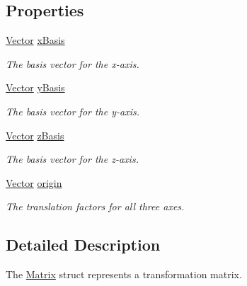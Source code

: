 \subsection*{Properties}
\begin{DoxyCompactItemize}
\item 
\mbox{\hyperlink{struct_leap_1_1_vector}{Vector}} \mbox{\hyperlink{struct_leap_1_1_matrix_a5778d424f6d76d84fe7a479b936b06ad}{x\+Basis}}
\begin{DoxyCompactList}\small\item\em The basis vector for the x-\/axis. \end{DoxyCompactList}\item 
\mbox{\hyperlink{struct_leap_1_1_vector}{Vector}} \mbox{\hyperlink{struct_leap_1_1_matrix_a1349c27faa44dff7480ca0e3d4a093f0}{y\+Basis}}
\begin{DoxyCompactList}\small\item\em The basis vector for the y-\/axis. \end{DoxyCompactList}\item 
\mbox{\hyperlink{struct_leap_1_1_vector}{Vector}} \mbox{\hyperlink{struct_leap_1_1_matrix_a26972992e511c04bcd5705e7d4153fd1}{z\+Basis}}
\begin{DoxyCompactList}\small\item\em The basis vector for the z-\/axis. \end{DoxyCompactList}\item 
\mbox{\hyperlink{struct_leap_1_1_vector}{Vector}} \mbox{\hyperlink{struct_leap_1_1_matrix_a8ba63742492635361dcd771e392bbce6}{origin}}
\begin{DoxyCompactList}\small\item\em The translation factors for all three axes. \end{DoxyCompactList}\end{DoxyCompactItemize}


\subsection{Detailed Description}
The \mbox{\hyperlink{struct_leap_1_1_matrix}{Matrix}} struct represents a transformation matrix. 


